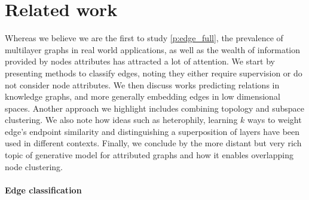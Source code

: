 \section{Related work}
\label{sec:edge_related}

Whereas we believe we are the first to study \autoref{p:edge_full}, the prevalence of multilayer
graphs in real world applications, as well as the wealth of information provided by nodes attributes
has attracted a lot of attention. We start by presenting methods to classify edges, noting they
either require supervision or do not consider node attributes. We then discuss works predicting
relations in knowledge graphs, and more generally embedding edges in low dimensional spaces. Another
approach we highlight includes combining topology and subspace clustering. We also note how ideas
such as heterophily, learning $k$ ways to weight edge's endpoint similarity and distinguishing a
superposition of layers have been used in different contexts. Finally, we conclude by the more
distant but very rich topic of generative model for attributed graphs and how it enables overlapping
node clustering.

\paragraph{Edge classification}
\label{par:erw_direct}


